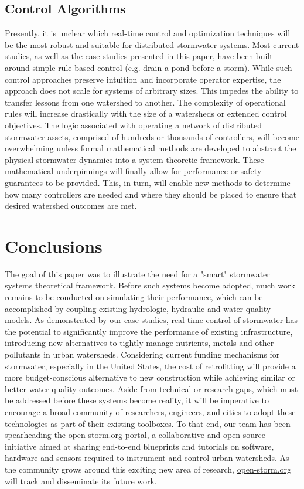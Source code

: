 \subsection{Control Algorithms}
Presently, it is unclear which real-time control and optimization techniques will be the most robust and suitable for distributed stormwater systems.  Most current studies, as well as the case studies presented in this paper, have been built around simple rule-based control (e.g. drain a pond before a storm). While such control approaches preserve intuition and incorporate operator expertise, the approach does not scale for systems of arbitrary sizes. This impedes the ability to transfer lessons from one watershed to another. The complexity of operational rules will increase drastically with the size of a watersheds or extended control objectives. The logic associated with operating a network of distributed stormwater assets, comprised of hundreds or thousands of controllers, will become overwhelming unless formal mathematical methods are developed to abstract the physical stormwater dynamics into a system-theoretic framework. These mathematical underpinnings will finally allow for performance or safety guarantees to be provided. This, in turn, will enable new methods to determine how many controllers are needed and where they should be placed to ensure that desired watershed outcomes are met. 

\section{Conclusions}
The goal of this paper was to illustrate the need for a "smart" stormwater systems theoretical framework. Before such systems become adopted, much work remains to be conducted on simulating their performance, which can be accomplished by coupling existing hydrologic, hydraulic and water quality models. As demonstrated by our case studies, real-time control of stormwater has the potential to significantly improve the performance of existing infrastructure, introducing new alternatives to tightly manage nutrients, metals and other pollutants in urban watersheds. Considering current funding mechanisms for stormwater, especially in the United States, the cost of retrofitting will provide a more budget-conscious alternative to new construction while achieving similar or better water quality outcomes. Aside from technical or research gaps, which must be addressed before these systems become reality, it will be imperative to encourage a broad community of researchers, engineers, and cities to adopt these technologies as part of their existing toolboxes. To that end, our team has been spearheading the \href{http://open-storm.org}{open-storm.org} portal, a collaborative and open-source initiative aimed at sharing end-to-end blueprints and tutorials on software, hardware and sensors required to instrument and control urban watersheds. As the community grows around this exciting new area of research, \href{http://open-storm.org}{open-storm.org} will track and disseminate its future work.
